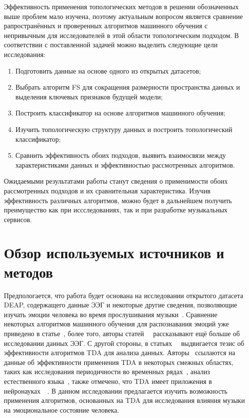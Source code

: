 \documentclass{article}
\begin{document}
Эффективность применения топологических методов в решении обозначенных выше проблем мало изучена, поэтому актуальным вопросом является сравнение рапространённых и проверенных алгоритмов машинного обучения с непривычным для исследователей в этой области топологическим подходом. В соответствии с поставленной задачей можно выделить следующие цели исследования:
\begin{enumerate}
\item Подготовить данные на основе одного из открытых датасетов;
\item Выбрать алгоритм FS для сокращения размерности пространства данных и выделения ключевых признаков будущей модели;
\item Построить классификатор на основе алгоритмов машинного обучения;
\item Изучить топологическую структуру данных и построить топологический классификатор;
\item Сравнить эффективность обоих подходов, выявить взаимосвязи между характеристиками данных и эффективностью рассмотренных алгоритмов.
\end{enumerate}

Ожидаемыми результатами работы станут сведения о применимости обоих рассмотренных подходов и их сравнительная характеристика. Изучив эффективность различных алгоритмов, можно будет в дальнейшем получить преимущество как при иссследованиях, так и при разработке музыкальных сервисов.

\section{Обзор используемых источников и методов}
Предпологается, что работа будет основана на исследовании открытого датасета DEAP, содержащего данные ЭЭГ и некоторые другие сведения, позволяющие изучать эмоции человека во время прослушивания музыки~\cite{Koelstra}. Сравнение некоторых алгоритмов машинного обучения для распознавания эмоций уже приведено в статье~\cite{Nawaz}, более того, авторы статей~\cite{Tandle}~\cite{Scherer} рассказывают ещё больше об исследовании данных ЭЭГ. С другой стороны, в статьях~\cite{Umeda}~\cite{Otter} выдвигается тезис об эффективности алгоритмов TDA для анализа данных. Авторы~\cite{Otter} ссылаются на данные об эффективности применения TDA в некоторых смежных областях, таких как исследования периодичности во временных рядах~\cite{Perea}, анализ естественного языка~\cite{Zhu}, также отмечено, что TDA имеет приложения в нейронауках~\cite{Curto}~\cite{Lord}. В данном исследовании предлагается изучить возможность применения алгоритмов, основанных на TDA для исследования влияния музыки на эмоциональное состояние человека.
\end{document}
